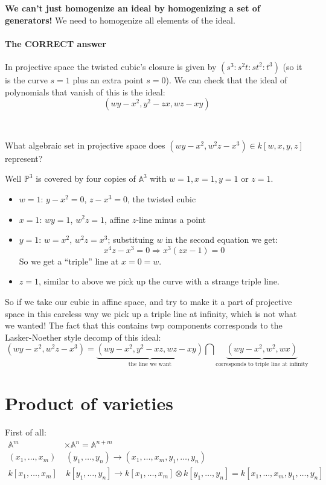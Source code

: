 \textbf{We can't just homogenize an ideal by homogenizing a set of generators!} We need to homogenize all elements of the ideal.


\paragraph*{The CORRECT answer}
In projective space the twisted cubic's closure is given by $(s^3\colon s^2t\colon st^2\colon t^3)$ (so it is the curve $s=1$ plus an extra point $s=0$). We can check that the ideal of polynomials that vanish of this is the ideal: \[(wy-x^2, y^2-zx, wz-xy)\]


\

What algebraic set in projective space does $(wy-x^2,w^2z-x^3)\in k[w,x,y,z]$ represent?

Well $\mathbb{P}^3$ is covered by four copies of $\mathbb{A}^3$ with $w=1,x=1,y=1$ or $z=1$.\begin{itemize}
    \item $w=1$: $y-x^2=0$, $z-x^3 = 0$, the twisted cubic
    \item $x=1$: $wy = 1$, $w^2z = 1$, affine $z$-line minus a point
    \item $y=1$: $w=x^2$, $w^2z=x^3$; substituing $w$ in the second equation we get:\begin{equation*}
        x^4z-x^3 = 0 \Rightarrow x^3(zx-1)=0
    \end{equation*} 
    So we get a ``triple'' line at $x=0=w$. 
    \item $z=1$, similar to above we pick up the curve with a strange triple line.
\end{itemize}
So if we take our cubic in affine space, and try to make it a part of projective space in this careless way we pick up a triple line at infinity, which is not what we wanted! The fact that this contains twp components corresponds to the Lasker-Noether style decomp of this ideal:\[(wy-x^2,w^2z-x^3) = \underbrace{(wy-x^2,y^2-xz, wz-xy)}_{\text{the line we want}}\bigcap \underbrace{(wy-x^2, w^2, wx)}_{\text{corresponds to triple line at infinity}}\]

\section{Product of varieties}

First of all:\begin{align*}
    \mathbb{A}^m&\times \mathbb{A}^n = \mathbb{A}^{n+m}\\
    (x_1,\dots,x_m) &\ (y_1,\dots,y_n) \rightarrow (x_1,\dots,x_m,y_1,\dots,y_n)\\
    k[x_1,\dots,  x_m] &\ k[y_1,\dots,y_n] \rightarrow k[x_1,\dots,  x_m] \otimes k[y_1,\dots,y_n] = k[x_1,\dots,x_m,y_1,\dots,y_n]
\end{align*} 

